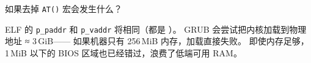 \begin{thinkbox}
如果去掉 \texttt{AT()} 宏会发生什么？

ELF 的 \texttt{p\_paddr} 和 \texttt{p\_vaddr} 将相同（都是 ）。
GRUB 会尝试把内核加载到物理地址  ≈ 3\,GiB——
如果机器只有 256\,MiB 内存，加载直接失败。
即使内存足够，1\,MiB 以下的 BIOS 区域也已经错过，浪费了低端可用 RAM。
\end{thinkbox}


